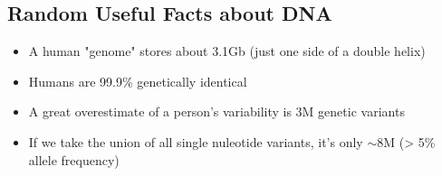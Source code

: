 \documentclass[10pt]{article}
\begin{document}
\subsection*{Random Useful Facts about DNA}
\begin{itemize}
    \item A human "genome" stores about 3.1Gb (just one side of a double helix)
    \item Humans are 99.9\% genetically identical
    \item A great overestimate of a person's variability is 3M genetic variants
    \item If we take the union of all single nuleotide variants, it's only $\sim$8M (> 5\% allele frequency)
\end{itemize}
\end{document}
